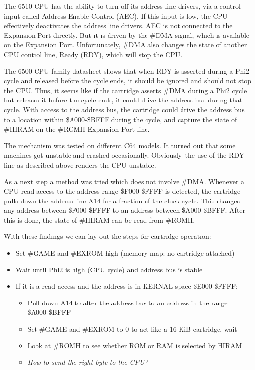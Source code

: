 \documentclass[a4paper,oneside]{memoir}
\begin{document}
The 6510 CPU has the ability to turn off its address line
drivers, via a control input called Address Enable Control (AEC). If
this input is low, the CPU effectively deactivates the address line
drivers. AEC is not connected to the Expansion
Port directly. But it is driven by the \#DMA signal, which is
available on the Expansion Port. Unfortunately, \#DMA also changes
the state of another CPU control line, Ready (RDY), which will stop
the CPU.

The 6500 CPU family datasheet shows that when RDY is asserted during a Phi2 cycle and released before the cycle ends, 
it should be ignored and should not stop the CPU. 
Thus, it seems like if the cartridge asserts \#DMA during a Phi2 cycle but releases it before the cycle ends, 
it could drive the address bus during that cycle.
With access to the address bus, the cartridge could drive the address bus to a location within \$A000-\$BFFF
during the cycle, and capture the state of \#HIRAM on the \#ROMH Expansion Port line.

The mechanism was tested on different C64 models. 
It turned out that some machines got unstable and crashed occasionally.
Obviously, the use of the RDY line as described above renders the CPU unstable.

As a next step a method was tried which does not involve \#DMA.
Whenever a CPU read access to the address range \$F000-\$FFFF is detected, 
the cartridge pulls down the address line A14 for a fraction of the clock cycle.
This changes any address between \$F000-\$FFFF to an address between \$A000-\$BFFF.
After this is done, the state of \#HIRAM can be read from \#ROMH.

With these findings we can lay out the steps for cartridge operation:

\begin{itemize}
\item Set \#GAME and \#EXROM high (memory map: no cartridge attached)
\item Wait until Phi2 is high (CPU cycle) and address bus is stable
\item If it is a read access and the address is in KERNAL space \$E000-\$FFFF:
    \begin{itemize}
    \item Pull down A14 to alter the address bus to an address in the range \$A000-\$BFFF
    \item Set \#GAME and \#EXROM to 0 to act like a 16 KiB cartridge, wait
    \item Look at \#ROMH to see whether ROM or RAM is selected by HIRAM
    \item \textit{How to send the right byte to the CPU?}
    \end{itemize}
\end{itemize}
\end{document}
